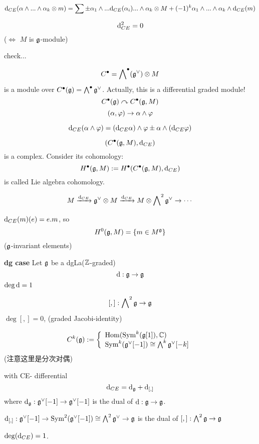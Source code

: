 $$
  \mathrm{d}_{CE}(\alpha\wedge...\wedge\alpha_k\otimes m)
=\sum\pm\alpha_1\wedge...\mathrm{d}_{CE}(\alpha_i)...\wedge\alpha_k\otimes M
+(-1)^k\alpha_1\wedge...\wedge\alpha_k\wedge\mathrm{d}_{CE}(m)
$$

\begin{prop}
$$\mathrm{d}_{CE}^2=0$$
($\iff$ $M$ is $\mathfrak{g}$-module)
\end{prop}
check...

\begin{rem}
$$C^{\bullet}=\bigwedge\nolimits^{\bullet}(\mathfrak{g}^\vee)\otimes M$$
is a module over $C^{\bullet}(\mathfrak{g})=\bigwedge\nolimits^{\bullet}\mathfrak{g}^\vee$.
Actually, this is a differential graded module!
$$C^{\bullet}(\mathfrak{g})\curvearrowright C^{\bullet}(\mathfrak{g},M)$$
$$(\alpha,\varphi)\to \alpha\wedge\varphi$$

$$\mathrm{d}_{CE}(\alpha\wedge\varphi)=(\mathrm{d}_{CE}\alpha)\wedge\varphi\pm\alpha\wedge(\mathrm{d}_{CE}\varphi)$$
\end{rem}

\begin{rem}
$$(C^{\bullet}(\mathfrak{g},M),\mathrm{d}_{CE})$$
is a complex. Consider its cohomology:
$$H^{\bullet}(\mathfrak{g},M):=H^{\bullet}(C^{\bullet}(\mathfrak{g},M),\mathrm{d}_{CE})$$
is called Lie algebra cohomology.
\end{rem}

$$M\xrightarrow{\mathrm{d}_{CE}}\mathfrak{g}^\vee\otimes M\xrightarrow{\mathrm{d}_{CE}}
M\otimes\bigwedge\nolimits^{2}\mathfrak{g}^\vee\to\cdots$$

$\mathrm{d}_{CE}(m)(e)=e.m$, so
$$H^0(\mathfrak{g},M)=\{m\in M^{\mathfrak{g}}\}$$
($\mathfrak{g}$-invariant elements)

\textbf{dg case}
Let $\mathfrak{g}$ be a dgLa($\mathbb{Z}$-graded)
$$\mathrm{d}:\mathfrak{g}\to\mathfrak{g}$$
$\deg\mathrm{d}=1$

$$[,]:\bigwedge\nolimits^{2}\mathfrak{g}\to\mathfrak{g}$$
$\deg[,]=0$,
(graded Jacobi-identity)

\begin{definition}
$$
  C^k(\mathfrak{g}):=
    \left\{
      \begin{array}{l}
        \operatorname{Hom}(\operatorname{Sym}^k(\mathfrak{g}[1]),\mathbb{C})  \\
        \operatorname{Sym}^k(\mathfrak{g}^\vee[-1])\cong\bigwedge\nolimits^{k}\mathfrak{g}^\vee[-k]
      \end{array}
    \right.
$$
(注意这里是分次对偶)

with CE- differential
$$\mathrm{d}_{CE}=\mathrm{d}_{\mathfrak{g}}+\mathrm{d}_{[,]}$$
where $\mathrm{d}_{\mathfrak{g}}:\mathfrak{g}^\vee[-1]\to\mathfrak{g}^\vee[-1]$ is the dual of $\mathrm{d}:\mathfrak{g}\to\mathfrak{g}$.

$\mathrm{d}_{[,]}:\mathfrak{g}^\vee[-1]\to \operatorname{Sym}^2(\mathfrak{g}^\vee[-1])\cong\bigwedge\nolimits^{2}\mathfrak{g}^\vee\to\mathfrak{g}$
is the dual of $[,]:\bigwedge\nolimits^{2}\mathfrak{g}\to\mathfrak{g}$
\end{definition}

$\deg(\mathrm{d}_{CE})=1$.

